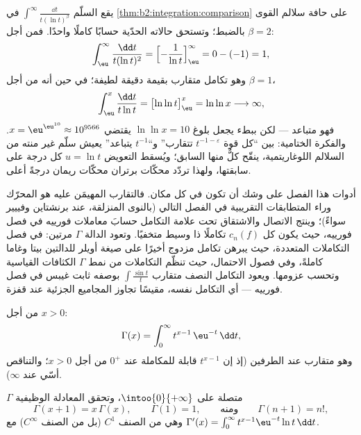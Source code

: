 \begin{example}\label{ex:b2:integration:bertrandboundary}
يقع السلّم $\int^\infty\frac{\dd t}{t(\ln t)^\beta}$ في
\cref{thm:b2:integration:comparison} على حافة سلالم القوى
بالضبط؛ وتستحق حالاته الحدّية حسابًا كاملًا
واحدًا. فمن أجل $\beta = 2$:
\[
\int_\eu^{\infty}\frac{\dd t}{t(\ln t)^2}
= \Bigl[-\frac{1}{\ln t}\Bigr]_\eu^{\infty}
= 0 - (-1) = 1 ,
\]
وهو تكامل متقارب بقيمة دقيقة لطيفة؛ في حين أنه من أجل
$\beta = 1$،
\[
\int_\eu^{x}\frac{\dd t}{t\ln t}
= \bigl[\ln\ln t\bigr]_\eu^{x} = \ln\ln x
\longrightarrow \infty ,
\]
فهو متباعد --- لكن ببطء يجعل بلوغ $\ln\ln x = 10$
يقتضي $x = \eu^{\eu^{10}} \approx 10^{9566}$. والفكرة
الختامية: بين ``كل قوة $t^{-1-\varepsilon}$
تتقارب'' و``$t^{-1}$ يتباعد'' يعيش سلّم غير منته
من السلالم اللوغاريتمية، ينقّح كلٌّ منها السابق؛ ويُسقط التعويض
$u = \ln t$ كل درجة على سابقتها، ولهذا
تردّد محكّات برتران محكّات ريمان درجةً
أعلى.
\end{example}

\begin{remark}
أدوات هذا الفصل على وشك أن تكون في كل مكان. فالتقارب
المهيمَن عليه هو المحرّك وراء المتطابقات التقريبية في
الفصل التالي (بالنوى المنزلقة، عند برنشتاين وفييير
سواءً)؛ وينتج الاتصال والاشتقاق تحت علامة التكامل
حسابَ معاملات فورييه في فصل فورييه،
حيث يكون كل $c_n(f)$ تكاملًا ذا وسيط متخفيًا. وتعود الدالة $\Gamma$
مرتين: في فصل التكاملات المتعددة، حيث يبرهن تكامل
مزدوج أخيرًا على صيغة أويلر للدالتين بيتا وغاما كاملةً، وفي
فصول الاحتمال، حيث تنظّم التكاملات من نمط $\Gamma$
الكثافات القياسية وتحسب عزومها. ويعود التكامل النصف متقارب
$\int\frac{\sin t}{t}$ بوصفه ثابت غيبس في
فصل فورييه --- أي التكامل نفسه، مقيسًا تجاوز
المجاميع الجزئية عند قفزة.
\end{remark}

\begin{definition}\label{def:b2:integration:gamma}
من أجل $x > 0$:
\[
\Gamma(x) = \int_0^{\infty} t^{x-1}\,\eu^{-t}\,\dd t ,
\]
وهو متقارب عند الطرفين (إذ إن $t^{x-1}$ قابلة للمكاملة عند $0^+$ من أجل $x > 0$؛
والتناقص أسّي عند $\infty$).
\end{definition}

\begin{theorem}\label{thm:b2:integration:gammaprops}
$\Gamma$ متصلة على $\intoo{0}{+\infty}$، وتحقق المعادلة
الوظيفية
\[
\Gamma(x + 1) = x\,\Gamma(x),
\qquad \Gamma(1) = 1,
\qquad\text{ومنه}\qquad \Gamma(n + 1) = n! ,
\]
وهي من الصنف $C^1$ (بل من الصنف $C^\infty$) مع $\Gamma'(x) =
\int_0^\infty t^{x-1}\eu^{-t}\ln t\,\dd t$.
\end{theorem}

